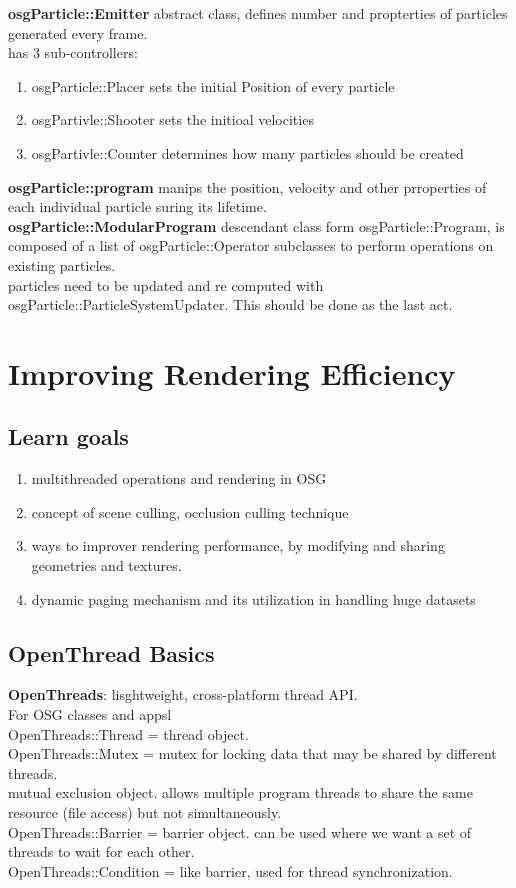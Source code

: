 \documentclass[a4paper,12pt]{book}
\begin{document}
\textbf{osgParticle::Emitter} abstract class, defines number and propterties of particles generated every frame.\\
has 3 sub-controllers:
\begin{enumerate}
\item osgParticle::Placer sets the initial Position of every particle
\item osgPartivle::Shooter sets the initioal velocities
\item osgPartivle::Counter determines how many particles should be created
\end{enumerate}
\textbf{osgParticle::program} manips the position, velocity and other prroperties of each individual particle suring its lifetime.\\
\textbf{osgParticle::ModularProgram} descendant class form osgParticle::Program, is composed of a list of osgParticle::Operator subclasses to perform operations on existing particles.\\

particles need to be updated and re computed with osgParticle::ParticleSystemUpdater. This should be done as the last act.

\chapter{Improving Rendering Efficiency}

\section{Learn goals}
\begin{enumerate}
\item multithreaded operations and rendering in OSG
\item concept of scene culling, occlusion culling technique
\item ways to improver rendering performance, by modifying and sharing geometries and textures.
\item dynamic paging mechanism and its utilization in handling huge datasets
\end{enumerate}

\section{OpenThread Basics}
\textbf{OpenThreads}: lisghtweight, cross-platform thread API.\\
For OSG classes and appsl\\
OpenThreads::Thread = thread object.\\
OpenThreads::Mutex = mutex for locking data that may be shared by different threads.\\
\textrightarrow mutual exclusion object. allows multiple program threads to share the same resource (file access) but not simultaneously.\\
OpenThreads::Barrier = barrier object. can be used where we want a set of threads to wait for each other.\\
OpenThreads::Condition = like barrier, used for thread synchronization.\\
\end{document}
